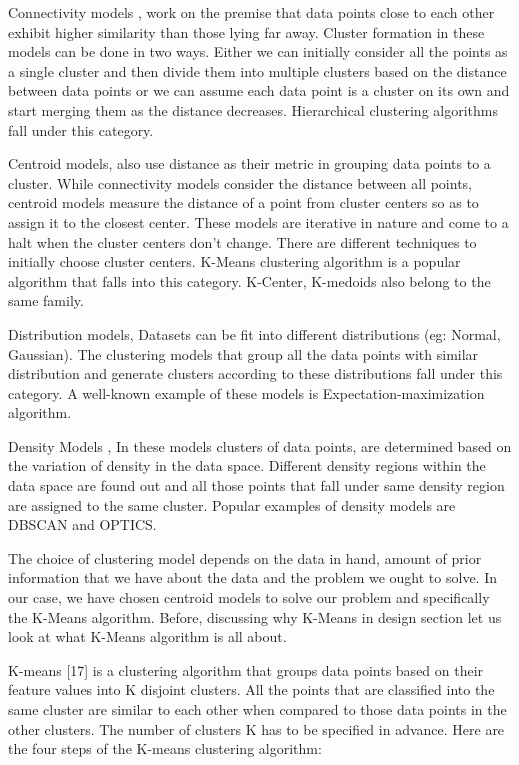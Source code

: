 Connectivity models \cite{doi:10.1093/comjnl/26.4.354}, work on the premise that data points close to each other exhibit higher similarity than those lying far away. Cluster formation in these models can be done in two ways. Either we can initially consider all the points as a single cluster and then divide them into multiple clusters based on the distance between data points or we can assume each data point is a cluster on its own and start merging them as the distance decreases. Hierarchical clustering algorithms fall under this category.

Centroid models, also use distance as their metric in grouping data points to a cluster. While connectivity models consider the distance between all points, centroid models measure the distance of a point from cluster centers so as to assign it to the closest center. These models are iterative in nature and come to a halt when the cluster centers don't change. There are different techniques to initially choose cluster centers.  K-Means clustering algorithm \cite{Derpanis06k-meansclustering} is a popular algorithm that falls into this category. K-Center, K-medoids also belong to the same family.
 
Distribution models\cite{Johnson2000}, Datasets can be fit into different distributions (eg: Normal, Gaussian). The clustering models that group all the data points with similar distribution and generate clusters according to these distributions fall under this category. A well-known example of these models is Expectation-maximization algorithm. 

Density Models \cite{thang2011anomaly}, In these models clusters of data points, are determined based on the variation of density in the data space. Different density regions within the data space are found out and all those points that fall under same density region are assigned to the same cluster. Popular examples of density models are DBSCAN and OPTICS.

The choice of clustering model depends on the data in hand, amount of prior information that we have about the data and the problem we ought to solve. In our case, we have chosen centroid models to solve our problem and specifically the K-Means algorithm. Before, discussing why K-Means in design section let us look at what K-Means algorithm is all about.

K-means [17] is a clustering algorithm that groups data points based on their feature values into K disjoint clusters. All the points that are classified into the same cluster are similar to each other when compared to those data points in the other clusters. The number of clusters K has to be specified in advance. Here are the four steps of the K-means clustering
algorithm:

